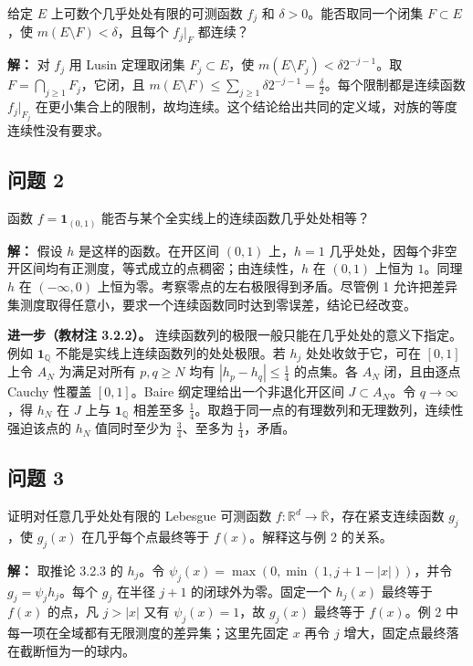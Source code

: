 \documentclass[11pt,a4paper]{article}
\begin{document}
给定 \(E\) 上可数个几乎处处有限的可测函数 \(f_j\) 和
\(\delta>0\)。能否取同一个闭集 \(F\subset E\)，使
\(m(E\setminus F)<\delta\)，且每个 \(f_j|_F\) 都连续？

\textbf{解：} 对 \(f_j\) 用 Lusin 定理取闭集 \(F_j\subset E\)，使
\(m(E\setminus F_j)<\delta2^{-j-1}\)。取
\(F=\bigcap_{j\ge1}F_j\)，它闭，且
\(m(E\setminus F)\le\sum_{j\ge1}\delta2^{-j-1}=\frac{\delta}{2}\)。每个限制都是连续函数
\(f_j|_{F_j}\)
在更小集合上的限制，故均连续。这个结论给出共同的定义域，对族的等度连续性没有要求。

\subsection{问题 2}\label{ux95eeux9898-2}

函数 \(f=\mathbf1_{(0,1)}\) 能否与某个全实线上的连续函数几乎处处相等？

\textbf{解：} 假设 \(h\) 是这样的函数。在开区间 \((0,1)\) 上，\(h=1\)
几乎处处，因每个非空开区间均有正测度，等式成立的点稠密；由连续性，\(h\)
在 \((0,1)\) 上恒为 \(1\)。同理 \(h\) 在 \((-\infty,0)\)
上恒为零。考察零点的左右极限得到矛盾。尽管例 1
允许把差异集测度取得任意小，要求一个连续函数同时达到零误差，结论已经改变。

\textbf{进一步（教材注 3.2.2）。}
连续函数列的极限一般只能在几乎处处的意义下指定。例如
\(\mathbf1_{\mathbb Q}\) 不能是实线上连续函数列的处处极限。若 \(h_j\)
处处收敛于它，可在 \([0,1]\) 上令 \(A_N\) 为满足对所有 \(p,q\ge N\) 均有
\(|h_p-h_q|\le\frac14\) 的点集。各 \(A_N\) 闭，且由逐点 Cauchy 性覆盖
\([0,1]\)。Baire 纲定理给出一个非退化开区间 \(J\subset A_N\)。令
\(q\to\infty\)，得 \(h_N\) 在 \(J\) 上与 \(\mathbf1_{\mathbb Q}\)
相差至多 \(\frac14\)。取趋于同一点的有理数列和无理数列，连续性强迫该点的
\(h_N\) 值同时至少为 \(\frac34\)、至多为 \(\frac14\)，矛盾。

\subsection{问题 3}\label{ux95eeux9898-3}

证明对任意几乎处处有限的 Lebesgue 可测函数
\(f:\mathbb R^d\to\overline{\mathbb R}\)，存在紧支连续函数 \(g_j\)，使
\(g_j(x)\) 在几乎每个点最终等于 \(f(x)\)。解释这与例 2 的关系。

\textbf{解：} 取推论 3.2.3 的 \(h_j\)。令
\(\psi_j(x)=\max(0,\min(1,j+1-|x|))\)，并令 \(g_j=\psi_jh_j\)。每个
\(g_j\) 在半径 \(j+1\) 的闭球外为零。固定一个 \(h_j(x)\) 最终等于
\(f(x)\) 的点，凡 \(j>|x|\) 又有 \(\psi_j(x)=1\)，故 \(g_j(x)\) 最终等于
\(f(x)\)。例 2 中每一项在全域都有无限测度的差异集；这里先固定 \(x\) 再令
\(j\) 增大，固定点最终落在截断恒为一的球内。
\end{document}
